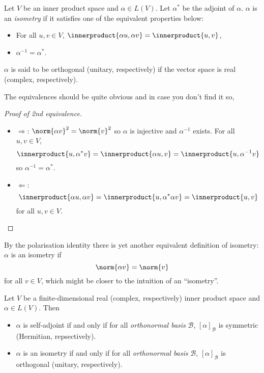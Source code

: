 \documentclass[a4paper]{article}
\newcommand*{\basis}{\mathcal}
\newcommand*{\ip}{\innerproduct}
\theoremstyle{definition}
\begin{document}
\begin{definition}[Isometry]
  Let \(V\) be an inner product space and \(\alpha \in L(V)\). Let \(\alpha^*\) be the adjoint of \(\alpha\). \(\alpha\) is an \emph{isometry} if it satisfies one of the equivalent properties below:
  \begin{itemize}
  \item For all \(u, v \in V\), \(\ip{\alpha u, \alpha v} = \ip{u, v}\),
  \item \(\alpha^{-1} = \alpha^*\).
  \end{itemize}

  \(\alpha\) is said to be orthogonal (unitary, respectively) if the vector space is real (complex, respectively).
\end{definition}

The equivalences should be quite obvious and in case you don't find it so,

\begin{proof}[Proof of 2nd equivalence]\leavevmode
  \begin{itemize}
  \item \(\Rightarrow\): \(\norm{\alpha v}^2 = \norm{v}^2\) so \(\alpha\) is injective and \(\alpha^{-1}\) exists. For all \(u, v \in V\),
    \[
      \ip{u, \alpha^*v} = \ip{\alpha u, v} = \ip{u, \alpha^{-1}v}
    \]
    so \(\alpha^{-1} = \alpha^*\).
  \item \(\Leftarrow\):
    \[
      \ip{\alpha u, \alpha v} = \ip{u, \alpha^*\alpha v} = \ip{u, v}
    \]
    for all \(u, v \in V\).
  \end{itemize}
\end{proof}

\begin{remark}
  By the polarisation identity there is yet another equivalent definition of isometry: \(\alpha\) is an isometry if
  \[
    \norm{\alpha v} = \norm{v}
  \]
  for all \(v \in V\), which might be closer to the intuition of an ``isometry''.
\end{remark}

\begin{lemma}
  Let \(V\) be a finite-dimensional real (complex, respectively) inner product space and \(\alpha \in L(V)\). Then
  \begin{itemize}
  \item \(\alpha\) is self-adjoint if and only if for all \emph{orthonormal basis} \(\basis B\), \([\alpha]_{\basis B}\) is symmetric (Hermitian, repsectively).
  \item \(\alpha\) is an isometry if and only if for all \emph{orthonormal basis} \(\basis B\), \([\alpha]_{\basis B}\) is orthogonal (unitary, respectively).
  \end{itemize}
\end{lemma}
\end{document}

